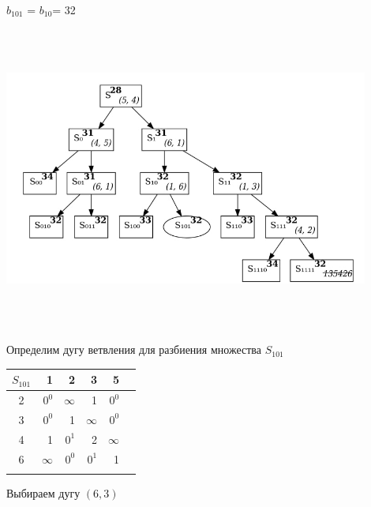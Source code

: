 \documentclass[12pt]{article}
\begin{document}
$b_{101}$ = $b_{10}$= 32\\
\begin{flushleft}
 
\includegraphics[width = 12cm, height = 10cm]{pictures/picture_08.jpg}\\
\end{flushleft}
\vspace{3cm}
\begin{flushleft}
 
Определим дугу ветвления для разбиения множества $S_{101}$\\
\end{flushleft}

\begin{flushleft}
\begin{tabular}{c||rrrr||c}
$S_{101}$ & 1 & 2 & 3 & 5 &  \\
\hline
\hline
2 & $0^0$ & $\infty$ & 1  & $0^0$ &  \\
3 & $0^0$ & 1 & $\infty$  & $0^0$ &  \\
4 & 1 & $0^1$ & 2  & $\infty$ &  \\
6 & $\infty$ & $0^0$ & $0^1$  & 1 &  \\
\hline
\hline
 &  &    &  & \\
\end{tabular}
\end{flushleft}

Выбираем дугу $(6,3)$
\end{document}
